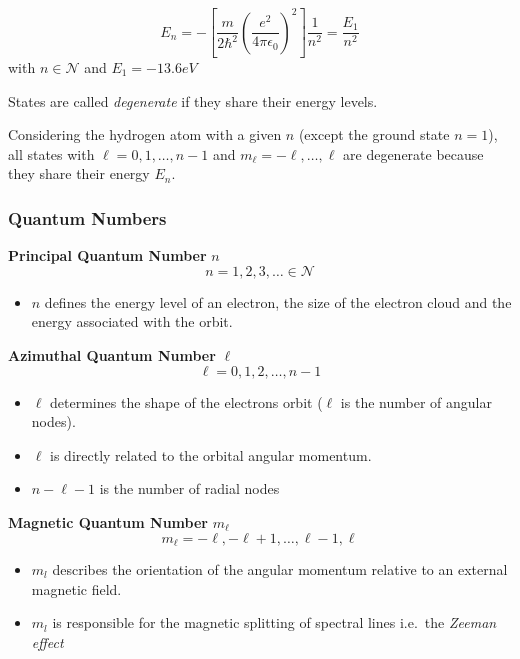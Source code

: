 
\begin{equation*}
    E_n = -\left[\frac{m}{2\hbar^2}{\left(\frac{e^2}{4\pi\epsilon_0}\right)}^2\right]\frac{1}{n^2} = \frac{E_1}{n^2}
\end{equation*}
with $n \in \mathcal{N}$ and $E_1 = -13.6eV$


States are called \textit{degenerate} if they share their energy levels.

Considering the hydrogen atom with a given $n$ (except the ground state $n=1$), all states with $\ell=0,1,\ldots, n-1$ and $m_\ell=-\ell, \ldots, \ell$ are degenerate because they share their energy $E_n$.


\subsubsection{Quantum Numbers}
\textbf{Principal Quantum Number} $n$
\noindent\begin{equation*}
    n = 1, 2, 3, \ldots \in \mathcal{N}
\end{equation*}
\begin{itemize}
    \item $n$ defines the energy level of an electron, the size of the electron cloud and the energy associated with the orbit.
\end{itemize}

\textbf{Azimuthal Quantum Number} $\ell$
\noindent\begin{equation*}
    \ell = 0, 1, 2, \ldots , n-1
\end{equation*}
\begin{itemize}
    \item $\ell$ determines the shape of the electrons orbit ($\ell$ is the number of angular nodes).
    \item $\ell$ is directly related to the orbital angular momentum.
    \item $n-\ell-1$ is the number of radial nodes
\end{itemize}

\newpar{}
\textbf{Magnetic Quantum Number} $m_\ell$
\noindent\begin{equation*}
    m_\ell =-\ell, -\ell+1, \ldots , \ell-1, \ell
\end{equation*}
\begin{itemize}
    \item $m_l$ describes the orientation of the angular momentum relative to an external magnetic field.
    \item $m_l$ is responsible for the magnetic splitting of spectral lines i.e.\ the \textit{Zeeman effect}
\end{itemize}

